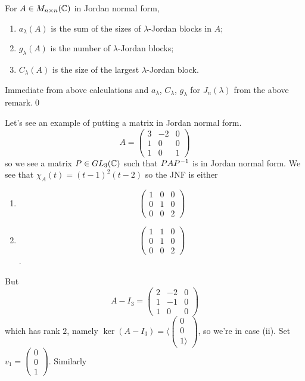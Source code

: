 \documentclass{article}
\begin{document}
\begin{proposition}
	For $ A\in M_{n\times n}(\mathbb{C}) $ in Jordan normal form,
	\begin{enumerate}
		\item $ a_\lambda(A) $ is the sum of the sizes of $ \lambda $-Jordan blocks in $ A $;
		\item $ g_\lambda(A) $ is the number of $ \lambda $-Jordan blocks;
		\item $ C_\lambda(A) $ is the size of the largest $ \lambda $-Jordan block.
	\end{enumerate}
\end{proposition}
\pf Immediate from above calculations and $ a_\lambda $, $ C_\lambda $, $ g_\lambda $ for $ J_n(\lambda) $ from the above remark.\qed
\par
Let's see an example of putting a matrix in Jordan normal form.
\[
  A=\begin{pmatrix}
3 & -2 & 0 \\
1 & 0 & 0 \\
1 & 0 & 1
  \end{pmatrix}
\]
so we see a matrix $ P\in GL_3(\mathbb{C}) $ such that $ PA{P}^{-1} $ is in Jordan normal form. We see that $ \chi_A(t)=(t-1)^2(t-2) $ so the JNF is either
  \begin{enumerate}
	  \item \[\begin{pmatrix}
			  1 & 0 & 0 \\
			  0 & 1 & 0 \\
			  0 & 0 & 2
		  \end{pmatrix}\]
  \item \[\begin{pmatrix}
		  1 & 1 & 0 \\
		  0 & 1 & 0 \\
		  0 & 0 & 2
	  \end{pmatrix}\].
  \end{enumerate}
But 
\[
  A-I_3=\begin{pmatrix}
	  2 & -2 & 0 \\
	  1 & -1 & 0 \\
	  1 & 0 & 0
  \end{pmatrix}
\]
which has rank $ 2 $, namely $ \ker(A-I_3)=\langle \begin{pmatrix}
  0\\ 0 \\ 1\rangle
\end{pmatrix} $, so we're in case (ii). Set $ v_1=\begin{pmatrix}
  0 \\ 0 \\ 1
\end{pmatrix} $. Similarly 
\end{document}
